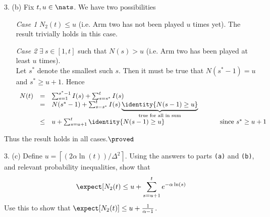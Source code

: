\documentclass[11pt,a4paper]{article}
\begin{document}
\begin{answer}{3. (b)}
  Fix $t,u\in\nats$. We have two possibilities
  \begin{itemize}
    \item[\textit{Case 1}] $N_2(t)\leq u$ (i.e. Arm two has not been played $u$ times yet). The result trivially holds in this case.
    \item[\textit{Case 2}] $\exists\ s\in[1,t]$ such that $N(s)>u$ (i.e. Arm two has been played at least $u$ times).\\ Let $s^*$ denote the smallest such $s$. Then it must be true that $N(s^*-1)=u$ and $s^*\geq u+1$. Hence
    \[\begin{array}{rclcl}
      N(t)&=&\sum_{s=1}^{s^*-1}I(s)+\sum_{s=s^*}^tI(s)&\quad&\\
      &=&N(s^*-1)+\sum_{s=s^*}^tI(s)\underbrace{\identity\{N(s-1)\geq u\}}_\text{true for all in sum}\\
      &\leq&u+\sum_{s=u+1}^t\identity\{N(s-1)\geq u\}&&\text{ since }s^*\geq u+1
    \end{array}\]
  \end{itemize}
  Thus the result holds in all cases.$\hfill\proved$
\end{answer}

\begin{question}{3. (c)}
  Define $u=\left\lceil(2\alpha\ln(t))/\Delta^2\right\rceil$. Using the answers to parts \texttt{(a)} and \texttt{(b)}, and relevant probability inequalities, show that
  \[ \expect[N_2(t)\leq u+\sum_{s=u+1}^te^{-\alpha\ln(s)} \]
  Use this to show that $\expect[N_2(t)]\leq u+\frac1{\alpha-1}$.
\end{question}
\end{document}
